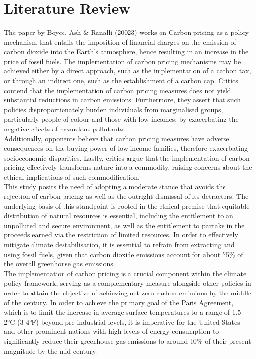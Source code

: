 \documentclass[12pt]{article}
\begin{document}
\section{Literature Review}
\paragraph{}
The paper by Boyce, Ash \& Ranalli (20023) works on Carbon pricing as a policy mechanism that entails the imposition of financial charges on the emission of carbon dioxide into the Earth's atmosphere, hence resulting in an increase in the price of fossil fuels. The implementation of carbon pricing mechanisms may be achieved either by a direct approach, such as the implementation of a carbon tax, or through an indirect one, such as the establishment of a carbon cap. Critics contend that the implementation of carbon pricing measures does not yield substantial reductions in carbon emissions. Furthermore, they assert that such policies disproportionately burden individuals from marginalised groups, particularly people of colour and those with low incomes, by exacerbating the negative effects of hazardous pollutants. 
\\[.5\baselineskip]
Additionally, opponents believe that carbon pricing measures have adverse consequences on the buying power of low-income families, therefore exacerbating socioeconomic disparities. Lastly, critics argue that the implementation of carbon pricing effectively transforms nature into a commodity, raising concerns about the ethical implications of such commodification.
\\[\baselineskip]
This study posits the need of adopting a moderate stance that avoids the rejection of carbon pricing as well as the outright dismissal of its detractors. The underlying basis of this standpoint is rooted in the ethical premise that equitable distribution of natural resources is essential, including the entitlement to an unpolluted and secure environment, as well as the entitlement to partake in the proceeds earned via the restriction of limited resources. In order to effectively mitigate climate destabilisation, it is essential to refrain from extracting and using fossil fuels, given that carbon dioxide emissions account for about 75\% of the overall greenhouse gas emissions. 
\\[.5\baselineskip]
The implementation of carbon pricing is a crucial component within the climate policy framework, serving as a complementary measure alongside other policies in order to attain the objective of achieving net-zero carbon emissions by the middle of the century. In order to achieve the primary goal of the Paris Agreement, which is to limit the increase in average surface temperatures to a range of 1.5-2°C (3-4°F) beyond pre-industrial levels, it is imperative for the United States and other prominent nations with high levels of energy consumption to significantly reduce their greenhouse gas emissions to around 10\% of their present magnitude by the mid-century.
\end{document}
